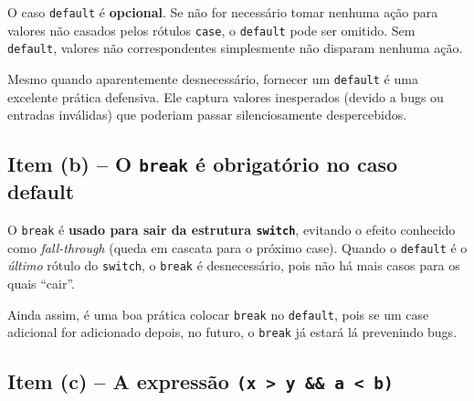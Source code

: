 \documentclass[12pt,a4paper]{article}
\begin{document}
\begin{tcolorbox}[colback=red!5,colframe=deitelred,title={\bfseries FALSO}]
O caso \texttt{default} é \textbf{opcional}. Se não for necessário tomar nenhuma
ação para valores não casados pelos rótulos \texttt{case}, o \texttt{default} pode
ser omitido. Sem \texttt{default}, valores não correspondentes simplesmente não
disparam nenhuma ação.

\begin{boaprática}
  Mesmo quando aparentemente desnecessário, fornecer um \texttt{default} é uma
  excelente prática defensiva. Ele captura valores inesperados (devido a bugs
  ou entradas inválidas) que poderiam passar silenciosamente despercebidos.
\end{boaprática}
\end{tcolorbox}

\subsection*{Item (b) -- O \texttt{break} é obrigatório no caso default}

\begin{tcolorbox}[colback=red!5,colframe=deitelred,title={\bfseries FALSO}]
O \texttt{break} é \textbf{usado para sair da estrutura \texttt{switch}}, evitando
o efeito conhecido como \textit{fall-through} (queda em cascata para o próximo case).
Quando o \texttt{default} é o \textit{último} rótulo do \texttt{switch}, o \texttt{break}
é desnecessário, pois não há mais casos para os quais ``cair''.

Ainda assim, é uma boa prática colocar \texttt{break} no \texttt{default}, pois se
um case adicional for adicionado depois, no futuro, o \texttt{break} já estará lá
prevenindo bugs.
\end{tcolorbox}

\subsection*{Item (c) -- A expressão \texttt{(x > y \&\& a < b)}}
\end{document}
